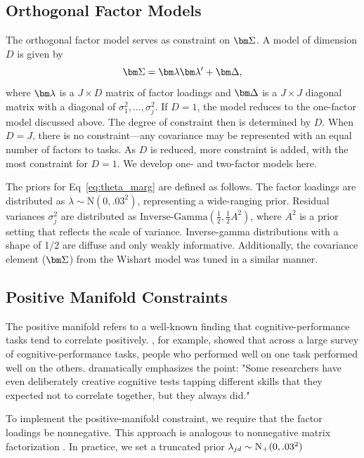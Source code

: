\documentclass[man, 12pt]{apa7} %
\begin{document}
\subsection{Orthogonal Factor Models}

The orthogonal factor model serves as constraint on $\bfSigma$.  A model of dimension $D$ is given by 
\begin{equation} \label{eq:theta_marg}
\bfSigma=\bflambda\bflambda'+\bfDelta,
\end{equation}
where $\bflambda$ is a $J\times D$ matrix of factor loadings and $\bfDelta$ is a $J \times J$ diagonal matrix with a diagonal of $\sigma_1^2,\ldots,\sigma_j^2$.  If $D=1$, the model reduces to the one-factor model discussed above.  The degree of constraint then is determined by $D$.  When $D=J$, there is no constraint---any covariance may be represented with an equal number of factors to tasks.  As $D$ is reduced, more constraint is added, with the most constraint for $D=1$.  We develop one- and two-factor models here.

The priors for Eq~\ref{eq:theta_marg} are defined as follows. The factor loadings are distributed as $\lambda\sim \mbox{N}(0,.03^2)$, representing a wide-ranging prior. Residual variances $\sigma_j^{2}$ are distributed as $\mbox{Inverse-Gamma}\left(\frac{1}{2},\frac{1}{2}A^2\right)$, where $A^2$ is a prior setting that reflects the scale of variance.  Inverse-gamma distributions with a shape of 1/2 are diffuse and only weakly informative. Additionally, the covariance element ($\bfSigma$) from the Wishart model was tuned in a similar manner.


\subsection{Positive Manifold Constraints}

The positive manifold refers to a well-known finding that cognitive-performance tasks tend to correlate positively.  \textcite{Carroll.1993}, for example, showed that across a large survey of cognitive-performance tasks, people who performed well on one task performed well on the others.  \textcite[p. 25]{Ritchie.2015} dramatically emphasizes the point: "Some researchers have even deliberately creative cognitive tests tapping different skills that they expected not to correlate together, but they always did."  

To implement the positive-manifold constraint, we require that the factor loadings be nonnegative.  This approach is analogous to nonnegative matrix factorization \parencite[]{Lee.Seung.1999}.  In practice, we set a truncated prior $\lambda_{jd}\sim\mbox{N}_+(0,.03^2)$ 
\end{document}

